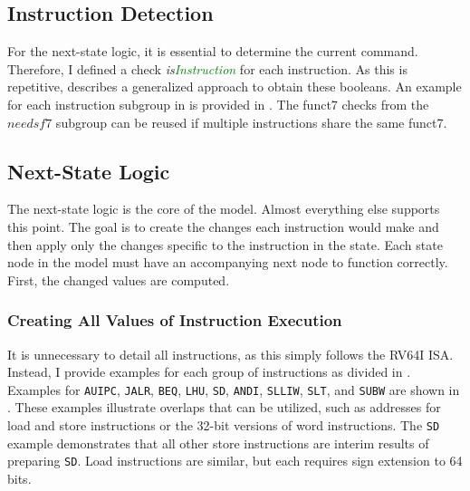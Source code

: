 




\subsection{Instruction Detection}
For the next-state logic, it is essential to determine the current
command. Therefore, I defined a check
\textsl{is\textcolor{Green}{Instruction}} for each instruction. As
this is repetitive,  describes a
generalized approach to obtain these booleans. An example for each
instruction subgroup in  is provided in
. The funct7 checks from the $needsf7$
subgroup can be reused if multiple instructions share the same
funct7.




\subsection{Next-State Logic}
The next-state logic is the core of the model. Almost everything else
supports this point. The goal is to create the changes each
instruction would make and then apply only the changes specific to
the instruction in the state. Each state node in the model must have
an accompanying next node to function correctly. First, the changed
values are computed.

\subsubsection{Creating All Values of Instruction Execution}
It is unnecessary to detail all instructions, as this simply follows
the RV64I ISA. Instead, I provide examples for each group of
instructions as divided in . Examples
for \texttt{AUIPC}, \texttt{JALR}, \texttt{BEQ}, \texttt{LHU},
\texttt{SD}, \texttt{ANDI}, \texttt{SLLIW}, \texttt{SLT}, and
\texttt{SUBW} are shown in . These examples
illustrate overlaps that can be utilized, such as addresses for load
and store instructions or the 32-bit versions of word instructions.
The \texttt{SD} example demonstrates that all other store
instructions are interim results of preparing \texttt{SD}. Load
instructions are similar, but each requires sign extension to 64
bits.

